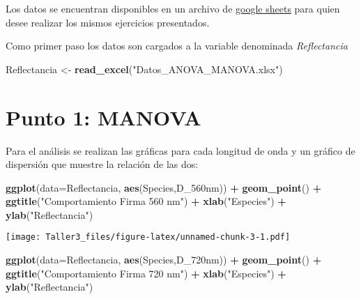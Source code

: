 \documentclass[
]{article}
\newenvironment{Shaded}{\begin{snugshade}}{\end{snugshade}}
\newcommand{\DataTypeTok}[1]{\textcolor[rgb]{0.13,0.29,0.53}{#1}}
\newcommand{\KeywordTok}[1]{\textcolor[rgb]{0.13,0.29,0.53}{\textbf{#1}}}
\newcommand{\NormalTok}[1]{#1}
\newcommand{\OperatorTok}[1]{\textcolor[rgb]{0.81,0.36,0.00}{\textbf{#1}}}
\newcommand{\StringTok}[1]{\textcolor[rgb]{0.31,0.60,0.02}{#1}}
\begin{document}
Los datos se encuentran disponibles en un archivo de
\href{https://docs.google.com/spreadsheets/d/1KeSKTZRl8or_yGPC7_876nhyAQlxqjK3EC9UVl8n4yc/edit?usp=sharing}{google
sheets} para quien desee realizar los mismos ejercicios presentados.

Como primer paso los datos son cargados a la variable denominada
\emph{Reflectancia}

\begin{Shaded}
\begin{Highlighting}[]
\NormalTok{Reflectancia <-}\StringTok{ }\KeywordTok{read_excel}\NormalTok{(}\StringTok{"Datos_ANOVA_MANOVA.xlsx"}\NormalTok{)}
\end{Highlighting}
\end{Shaded}

\hypertarget{punto-1-manova}{%
\section{Punto 1: MANOVA}\label{punto-1-manova}}

Para el análisis se realizan las gráficas para cada longitud de onda y
un gráfico de dispersión que muestre la relación de las dos:

\begin{Shaded}
\begin{Highlighting}[]
\KeywordTok{ggplot}\NormalTok{(}\DataTypeTok{data=}\NormalTok{Reflectancia, }\KeywordTok{aes}\NormalTok{(Species,D_560nm)) }\OperatorTok{+}\StringTok{ }\KeywordTok{geom_point}\NormalTok{() }\OperatorTok{+}\StringTok{ }\KeywordTok{ggtitle}\NormalTok{(}\StringTok{"Comportamiento Firma 560 nm"}\NormalTok{) }\OperatorTok{+}\StringTok{ }\KeywordTok{xlab}\NormalTok{(}\StringTok{"Especies"}\NormalTok{) }\OperatorTok{+}\StringTok{ }\KeywordTok{ylab}\NormalTok{(}\StringTok{"Reflectancia"}\NormalTok{)}
\end{Highlighting}
\end{Shaded}

\texttt{[image: Taller3\_files/figure-latex/unnamed-chunk-3-1.pdf]}

\begin{Shaded}
\begin{Highlighting}[]
\KeywordTok{ggplot}\NormalTok{(}\DataTypeTok{data=}\NormalTok{Reflectancia, }\KeywordTok{aes}\NormalTok{(Species,D_720nm)) }\OperatorTok{+}\StringTok{ }\KeywordTok{geom_point}\NormalTok{() }\OperatorTok{+}\StringTok{ }\KeywordTok{ggtitle}\NormalTok{(}\StringTok{"Comportamiento Firma 720 nm"}\NormalTok{) }\OperatorTok{+}\StringTok{ }\KeywordTok{xlab}\NormalTok{(}\StringTok{"Especies"}\NormalTok{) }\OperatorTok{+}\StringTok{ }\KeywordTok{ylab}\NormalTok{(}\StringTok{"Reflectancia"}\NormalTok{)}
\end{Highlighting}
\end{Shaded}
\end{document}
